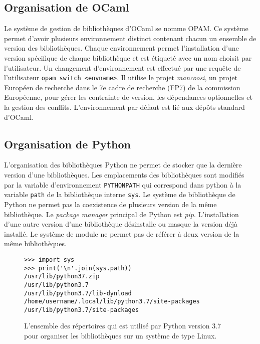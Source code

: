 
\subsection{Organisation de OCaml}
Le système de gestion de bibliothèques d'OCaml se nomme OPAM. Ce système permet d'avoir
plusieurs environnement distinct contenant chacun un ensemble de version des bibliothèques.
Chaque environnement permet l'installation d'une version spécifique de chaque bibliothèque et
est étiqueté avec un nom choisit par l'utilisateur. Un changement d'environnement est
effectué par une requête de l'utilisateur \verb|opam switch <envname>|. Il utilise
le projet \textit{mancoosi}, un projet Européen de recherche dans le 7e cadre de recherche (FP7)
de la commission Européenne, pour gérer les contrainte de version, les dépendances optionnelles
et la gestion des conflits. L'environnement par défaut est lié aux dépôts standard d'OCaml.

\subsection{Organisation de Python}
L'organisation des bibliothèques Python ne permet de stocker que la dernière version
d'une bibliothèques. Les emplacements des bibliothèques sont modifiés par la variable d'environnement
\verb|PYTHONPATH| qui correspond dans python à la variable \verb|path| de la bibliothèque
interne \verb|sys|. Le système de bibliothèque de Python ne permet pas la coexistence de plusieurs
version de la même bibliothèque. Le \textit{package manager} principal de Python est \textit{pip}.
L'installation d'une autre version d'une bibliothèque désinstalle
ou masque la version déjà installé. Le système de module ne permet pas de référer à deux version
de la même bibliothèques.

\begin{figure}[ht]
    \begin{minipage}[t]{0.5\textwidth}
\begin{verbatim}
>>> import sys
>>> print('\n'.join(sys.path))
/usr/lib/python37.zip
/usr/lib/python3.7
/usr/lib/python3.7/lib-dynload
/home/username/.local/lib/python3.7/site-packages
/usr/lib/python3.7/site-packages
\end{verbatim}
    \end{minipage}
    \caption{L'ensemble des répertoires qui est utilisé par Python version 3.7
    pour organiser les bibliothèques sur un système de type Linux.}
\end{figure}

